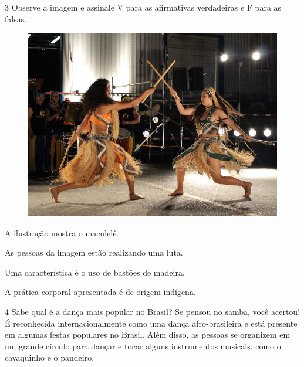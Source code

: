 
\num{3} Observe a imagem e assinale V para as afirmativas verdadeiras e F para as falsas.

\begin{figure}[htpb!]
\includegraphics[width=\textwidth]{./imgs/img12.jpg}
\end{figure}

\begin{boxlist}
\item A ilustração mostra o maculelê. 

\item As pessoas da imagem estão realizando uma luta. 

\item Uma característica é o uso de bastões de madeira. 

\item A prática corporal apresentada é de origem indígena. 
\end{boxlist}


\num{4} Sabe qual é a dança mais popular no Brasil? Se pensou no samba, você
  acertou! É reconhecida internacionalmente como uma dança
  afro-brasileira e está presente em algumas festas populares no Brasil.
  Além disso, as pessoas se organizem em um grande círculo para dançar e
  tocar alguns instrumentos musicais, como o cavaquinho e o pandeiro.

